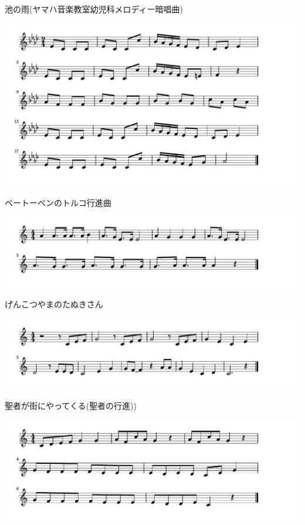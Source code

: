 \documentclass[a4paper]{ltjsarticle}
\begin{document}
\vspace{-10mm} \hspace{10mm}
池の雨(ヤマハ音楽教室幼児科メロディー暗唱曲)

\includegraphics[clip]{turkbeethoven_crop.pdf}

\vspace{-10mm} \hspace{10mm}
ベートーベンのトルコ行進曲

\includegraphics[clip]{genkotsu_crop.pdf}

\vspace{-10mm} \hspace{10mm}
げんこつやまのたぬきさん

\includegraphics[clip]{seija_crop.pdf}

\vspace{-10mm} \hspace{10mm}
聖者が街にやってくる(聖者の行進))

\includegraphics[clip]{kogitsune_crop.pdf}
\end{document}
